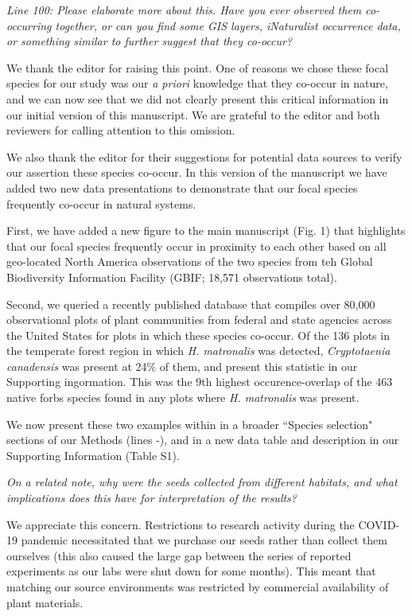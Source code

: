 \documentclass[11pt]{article}
\begin{document}
\emph{Line 100: Please elaborate more about this. Have you ever observed them co-occurring together, or can you find some GIS layers, iNaturalist occurrence data, or something similar to further suggest that they co-occur?} 

We thank the editor for raising this point. One of reasons we chose these focal species for our study was our \emph{a priori} knowledge that they co-occur in nature, and we can now see that we did not clearly present this critical information in our initial version of this manuscript. We are grateful to the editor and both reviewers for calling attention to this omission.

We also thank the editor for their suggestions for potential data sources to verify our assertion these species co-occur. In this version of the manuscript we have added two new data presentations to demonstrate that our focal species frequently co-occur in natural systems. 

First, we have added a new figure to the main manuscript (Fig. 1) that highlights that our focal species frequently occur in proximity to each other based on all geo-located North America observations of the two species from teh Global Biodiversity Information Facility (GBIF; 18,571 observations total).

Second, we queried a recently published database that compiles over 80,000 observational plots of plant communities from federal and state agencies across the United States for plots in which these species co-occur. Of the 136 plots in the temperate forest region in which \emph{H. matronalis} was detected, \emph{Cryptotaenia canadensis} was present at 24\% of them, and present this statistic in our Supporting ingormation. This was the 9th highest occurence-overlap of the 463 native forbs species found in any plots where \emph{H. matronalis} was present. %

We now present these two examples within in a broader ``Species selection" sections of our Methods (lines -), and in a new data table and description in our Supporting Information (Table S1).


\emph{On a related note, why were the seeds collected from different habitats, and what implications does this have for interpretation of the results?}

We appreciate this concern. Restrictions to research activity during the COVID-19 pandemic necessitated that we purchase our seeds rather than collect them ourselves (this also caused the large gap between the series of reported experiments as our labs were shut down for some months). This meant that matching our source environments was restricted by commercial availability of plant materials. %
\end{document}
